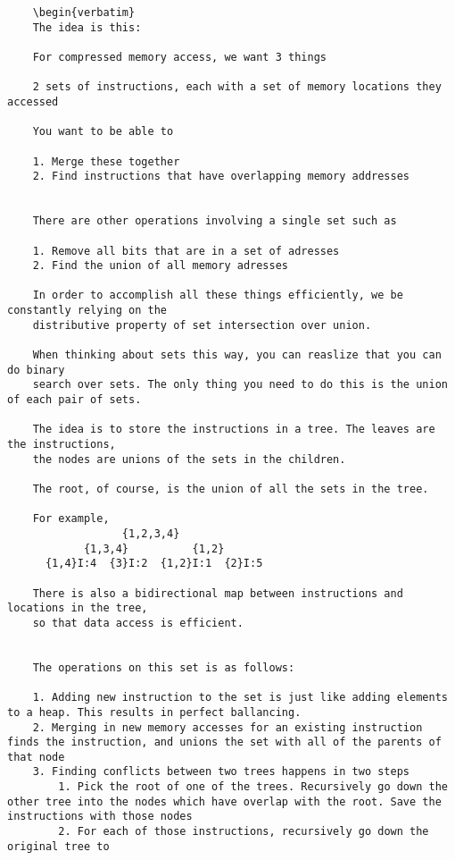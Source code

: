 \documentclass[12pt,twoside]{reedthesis}
\begin{document}
		\begin{verbatim}
    \begin{verbatim}
    The idea is this:

    For compressed memory access, we want 3 things

    2 sets of instructions, each with a set of memory locations they accessed

    You want to be able to

    1. Merge these together
    2. Find instructions that have overlapping memory addresses


    There are other operations involving a single set such as

    1. Remove all bits that are in a set of adresses
    2. Find the union of all memory adresses

    In order to accomplish all these things efficiently, we be constantly relying on the
    distributive property of set intersection over union.

    When thinking about sets this way, you can reaslize that you can do binary
    search over sets. The only thing you need to do this is the union of each pair of sets.

    The idea is to store the instructions in a tree. The leaves are the instructions,
    the nodes are unions of the sets in the children.

    The root, of course, is the union of all the sets in the tree.

    For example,
                  {1,2,3,4}
            {1,3,4}          {1,2}
      {1,4}I:4  {3}I:2  {1,2}I:1  {2}I:5

    There is also a bidirectional map between instructions and locations in the tree,
    so that data access is efficient.


    The operations on this set is as follows:

    1. Adding new instruction to the set is just like adding elements to a heap. This results in perfect ballancing.
    2. Merging in new memory accesses for an existing instruction finds the instruction, and unions the set with all of the parents of that node
    3. Finding conflicts between two trees happens in two steps
        1. Pick the root of one of the trees. Recursively go down the other tree into the nodes which have overlap with the root. Save the instructions with those nodes
        2. For each of those instructions, recursively go down the original tree to
    \end{verbatim}
	
\end{document}

